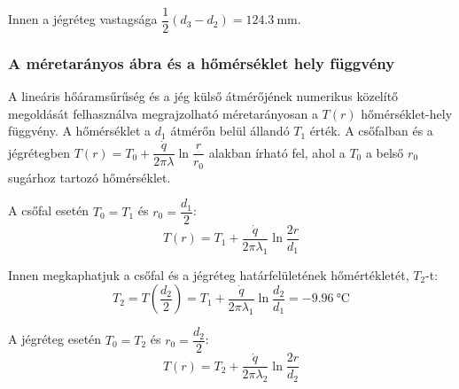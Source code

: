 Innen a jégréteg vastagsága $\dfrac{1}{2}\left(d_3 - d_2\right) = \SI{124.3}{\milli\meter}$.

\subsubsection*{A méretarányos ábra és a hőmérséklet hely függvény}
A lineáris hőáramsűrűség és a jég külső átmérőjének numerikus közelítő megoldását felhasználva megrajzolható méretarányosan a $T\!\left(r\right)$ hőmérséklet-hely függvény. A hőmérséklet a $d_1$ átmérőn belül állandó $T_1$ érték. A csőfalban és a jégrétegben $T\!\left(r\right) = T_0 + \dfrac{\dot{q}}{2 \pi \lambda} \ln\dfrac{r}{r_0}$ alakban írható fel, ahol a $T_0$ a belső $r_0$ sugárhoz tartozó hőmérséklet.

A csőfal esetén $T_0 = T_1$ és $r_0 = \dfrac{d_1}{2}$:
\begin{equation}
	T\!\left(r\right) = T_1 + \dfrac{\dot{q}}{2 \pi \lambda_1} \ln\dfrac{2 r}{d_1}
\end{equation}

Innen megkaphatjuk a csőfal és a jégréteg határfelületének hőmértékletét, $T_2$-t:
\begin{equation}
	T_2 = T\!\left(\frac{d_2}{2}\right) = T_1 + \dfrac{\dot{q}}{2 \pi \lambda_1} \ln\dfrac{d_2}{d_1} = \SI{-9.96}{\celsius}
\end{equation}

A jégréteg esetén $T_0 = T_2$ és $r_0 = \dfrac{d_2}{2}$:
\begin{equation}
	T\!\left(r\right) = T_2 + \dfrac{\dot{q}}{2 \pi \lambda_2} \ln\dfrac{2 r}{d_2}
\end{equation}

